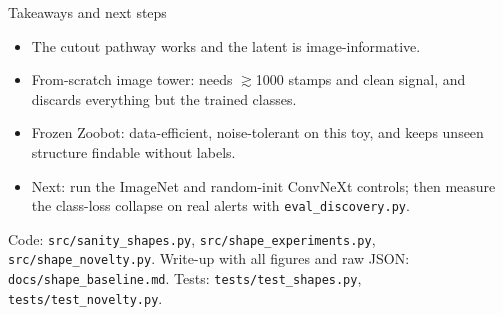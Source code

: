 \documentclass[aspectratio=169,10pt]{beamer}
\begin{document}
\begin{frame}{Takeaways and next steps}
  \begin{itemize}
    \item The cutout pathway works and the latent is image-informative.
    \item From-scratch image tower: needs $\gtrsim$1000 stamps and clean signal, and discards
      everything but the trained classes.
    \item Frozen Zoobot: data-efficient, noise-tolerant on this toy, and keeps unseen
      structure findable without labels.
    \item Next: run the ImageNet and random-init ConvNeXt controls; then measure the
      class-loss collapse on real alerts with \texttt{eval\_discovery.py}.
  \end{itemize}
  \vspace{0.5em}
  \footnotesize Code: \texttt{src/sanity\_shapes.py}, \texttt{src/shape\_experiments.py},
  \texttt{src/shape\_novelty.py}. Write-up with all figures and raw JSON:
  \texttt{docs/shape\_baseline.md}. Tests: \texttt{tests/test\_shapes.py},
  \texttt{tests/test\_novelty.py}.
\end{frame}
\end{document}
